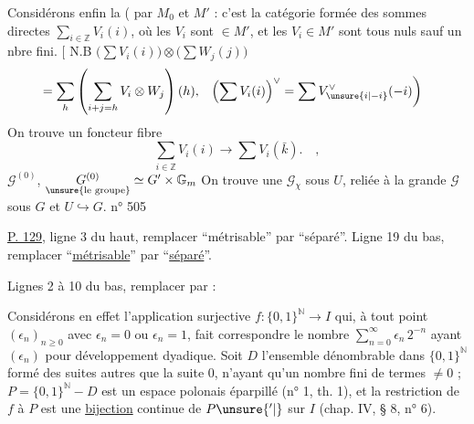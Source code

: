 Considérons enfin la 
( par $M_0$ et $M'$ : c'est la catégorie formée des
sommes directes $\displaystyle\sum_{i\in\mathbb Z}V_i(i)$, où les
$V_i$ sont $\in M'$, et les $V_i\in M'$ sont tous
nuls sauf un nbre fini. $\big[$ N.B $\big(\sum V_i(i)\big)\otimes\big(\sum W_j(j)\big)$
\[
\begin{aligned}
 &=\sum_h\left(\sum_{i+j=h} V_i\otimes W_j\right)(h),&
 \left(\sum V_i(i)\right)^\vee&=\sum V_{\unsure{i|-i}}^\vee(-i)\bigg)
\end{aligned}
\]
On trouve un foncteur fibre
\[
 \sum_{i\in\mathbb Z}V_i(i)\longrightarrow\sum V_i(\bar k).\quad,
\]
 $\mathscr G^{(0)}$, $\underset{\text{\unsure{le groupe}}}{G^{(0)}}\simeq G'\times\mathbb G_m$
On trouve une  $\mathscr G_{\chi}$ sous $U$,
reliée à la grande $\mathscr G$ sous $G$  et $U\hookrightarrow G$.
\hfill n° 505

\uline{P. 129}, ligne 3 du haut, remplacer ``métrisable'' par ``séparé''. Ligne 19 du bas,
remplacer ``\uline{métrisable}'' par ``\uline{séparé}''.

Lignes 2 à 10 du bas, remplacer par :

Considérons en effet l'application surjective $f:\{0,1\}^{\mathbb N}\to I$ qui, à tout
point $(\epsilon_n)_{n\geq 0}$ avec $\epsilon_n=0$ ou $\epsilon_n=1$, fait correspondre le nombre
$\displaystyle\sum_{n=0}^{\infty}\epsilon_n\,2^{-n}$ ayant $(\epsilon_n)$ pour développement dyadique. Soit $D$ l'ensemble dénombrable dans $\{0,1\}^{\mathbb N}$ formé des suites autres que la suite $0$, n'ayant qu'un nombre fini de termes $\ne 0$ ; $P=\{0,1\}^{\mathbb N}-D$ est un espace polonais éparpillé (n° 1,
th. 1), et la restriction de $f$ à $P$ est une \uline{bijection} continue de $P\unsure{'|{}}$ sur $I$
(chap. IV, § 8, n° 6).

